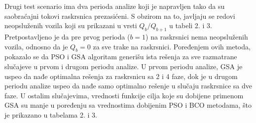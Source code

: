 Drugi test scenario ima dva perioda analize koji je napravljen tako da su saobraćajni tokovi raskrsnica prezasićeni. S obzirom na to, javljaju se redovi neopsluženih vozila koji su prikazani u vrsti $Q_b / Q_{b+1}$ u tabeli 2. i 3. Pretpostavljeno je da pre prvog perioda ($b=1$) na raskrsnici nema neopsluženih vozila, odnosno da je $Q_b = 0$ za sve trake na raskrsnici. Poređenjem ovih metoda, pokazalo se da PSO i GSA algoritam generišu ista rešenja za sve razmatrane slučajeve u prvom i drugom periodu analize. U prvom periodu analize, GSA je uspeo da nađe optimalna rešenja za raskrsnicu sa 2 i 4 faze, dok je u drugom periodu analize uspeo da nađe samo optimalno rešenje u slučaju raskrsnice sa dve faze. U ostalim slučajevima, vrednosti funkcije cilja koje su dobijene primenom GSA su manje u poređenju sa vrednostima dobijenim PSO i BCO metodama, što je prikazano u tabelama 2. i 3. 








